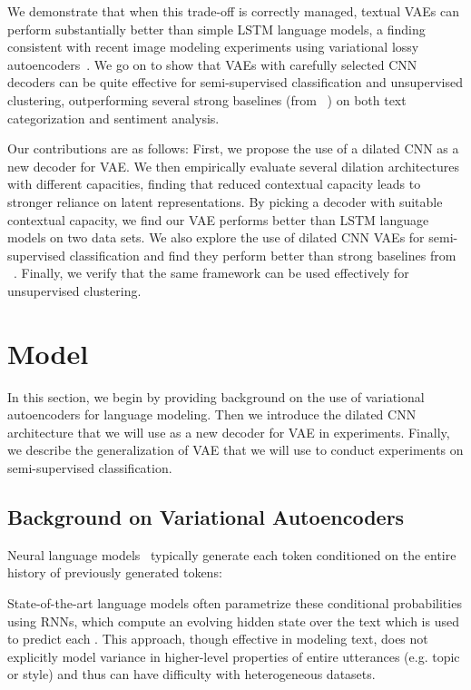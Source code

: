 \documentclass{article}
\begin{document}
We demonstrate that when this trade-off is correctly managed, textual VAEs can perform substantially better than simple LSTM language models, a finding consistent with recent image modeling experiments
using variational lossy autoencoders~\cite{chen2016variational}.
We go on to show that VAEs with carefully selected CNN decoders can be quite effective for semi-supervised classification and unsupervised clustering,
outperforming several strong baselines (from ~\cite{dai2015semi}) on both text categorization and sentiment analysis.

Our contributions are as follows: First, we propose the use of a dilated CNN as a new decoder
for VAE. We then empirically evaluate several dilation architectures with different capacities, finding that
reduced contextual capacity leads to stronger reliance on latent representations.
By picking a decoder with suitable contextual capacity, we find our VAE performs better than
LSTM language models on two data sets.
We also explore the use of dilated CNN VAEs for semi-supervised
classification and find they perform better than strong baselines from
~\cite{dai2015semi}. Finally, we verify that the same framework can be used
effectively for unsupervised clustering.


\section{Model}
In this section, we begin by providing background on the use of variational autoencoders for language modeling.
Then we introduce the dilated CNN architecture that we will use as a new decoder for VAE in experiments.
Finally, we describe the generalization of VAE that we will use to conduct experiments on semi-supervised classification.


\subsection{Background on Variational Autoencoders}
Neural language models~\cite{mikolov2010recurrent} typically generate each token
 conditioned on the entire history of previously generated tokens:

State-of-the-art language models often parametrize these conditional probabilities
using RNNs, which compute an evolving hidden state
over the text which is used to predict each . This approach, though effective in modeling text, does not explicitly model variance in higher-level properties of entire utterances (e.g. topic or style) and thus can have difficulty with heterogeneous datasets.
\end{document}
